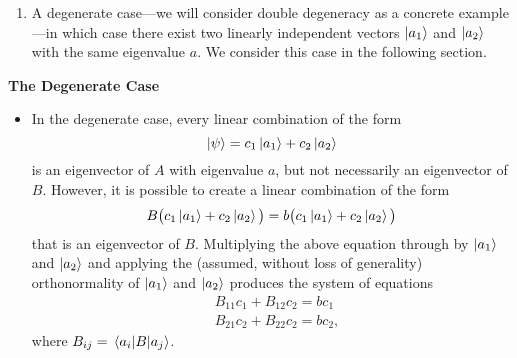 \documentclass[11pt, a4paper]{article}
\begin{document}
\begin{itemize}
\begin{enumerate}
        \item A degenerate case---we will consider double degeneracy as a concrete example---in which case there exist two linearly independent vectors $ \ket{a_{1}} $ and $ \ket{a_{2}} $ with the same eigenvalue $ a $. We consider this case in the following section.
    \end{enumerate}
\end{itemize}

\textbf{The Degenerate Case}

\begin{itemize}
    
   \item In the degenerate case, every linear combination of the form
    \begin{equation*}
        \ket{\psi} = c_{1} \ket{a_{1}} + c_{2} \ket{a_{2}}
    \end{equation*}
    is an eigenvector of $ A $ with eigenvalue $ a $, but not necessarily an eigenvector of $ B $. However, it is possible to create a linear combination of the form
    \begin{equation*}
        B \big( c_{1} \ket{a_{1}} + c_{2} \ket{a_{2}}\big) = b \big( c_{1} \ket{a_{1}} + c_{2} \ket{a_{2}} \big)
    \end{equation*}
    that is an eigenvector of $ B $. Multiplying the above equation through by $ \ket{a_{1}} $ and $ \ket{a_{2}} $ and applying the (assumed, without loss of generality) orthonormality of $ \ket{a_{1}} $ and $ \ket{a_{2}} $ produces the system of equations
    \begin{align*}
        & B_{11} c_{1} + B_{12} c_{2} = bc_{1}\\
        & B_{21} c_{2} + B_{22} c_{2} = bc_{2},
    \end{align*}
    where $ B_{ij} = \mel{a_{i}}{B}{a_{j}} $. 


\end{itemize}
\end{document}

